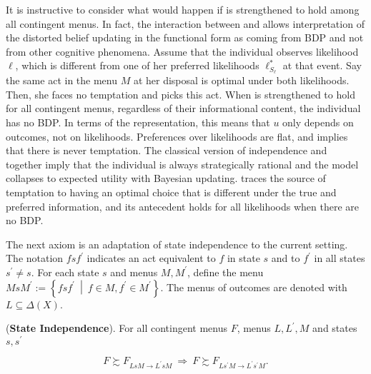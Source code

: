 It is instructive to consider what would happen if  is strengthened to hold among all contingent menus. In fact, the interaction between  and  allows interpretation of the distorted belief updating in the functional form as coming from BDP and not from other cognitive phenomena. Assume that the individual observes likelihood \( \ell \), which is different from one of her preferred likelihoods \( \ell^{*}_{S_{\ell}}\) at that event. Say the same act in the menu \( M \) at her disposal is optimal under both likelihoods. Then, she faces no temptation and picks this act. When  is strengthened to hold for all contingent menus, regardless of their informational content, the individual has no BDP. In terms of the representation, this means that \( u \) only depends on outcomes, not on likelihoods. Preferences over likelihoods are flat, and  implies that there is never temptation. The classical version of independence and  together imply that the individual is always strategically rational and the model collapses to expected utility with Bayesian updating.  traces the source of temptation to having an optimal choice that is different under the true and preferred information, and its antecedent holds for all likelihoods when there are no BDP.

The next axiom is an adaptation of state independence to the current setting. The notation \( f s f^{\prime} \) indicates an act equivalent to \( f \) in state \( s \) and to \( f^{\prime} \) in all states \( s^{\prime} \neq s \). For each state \( s \) and menus \( M, M^{\prime} \), define the menu \( M s M^{\prime} := \left\{ f s f^{\prime} \: \middle\vert  \: f \in M, f^{\prime} \in M^{\prime} \right\} \). The menus of outcomes are denoted with \( L \subseteq \Delta \left( X \right) \).

\begin{axiom}\label{ax:sindependence}

	(\textbf{\textbf{State Independence}}). For all contingent menus \( F \), menus \( L, L^{\prime}, M \) and states \( s, s^{\prime} \)

	\[
		F \succsim F_{L s M \rightarrow L^{\prime} s M} \: \Rightarrow \: F \succsim F_{L s^{\prime} M \rightarrow L^{\prime} s^{\prime} M} .
	\]

\end{axiom}

